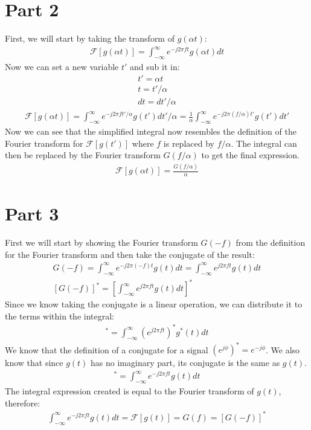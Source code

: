 \documentclass[12 pt]{article}
\begin{document}
\section*{Part 2}
First, we will start by taking the transform of $g(\alpha t)$:
\begin{align*}
    \mathcal{F}[g(\alpha t)]=\int_{-\infty}^{\infty}e^{-j2\pi ft}g(\alpha t)dt
\end{align*}
Now we can set a new variable $t'$ and sub it in:
\begin{align*}
    t'=\alpha t \\
    t = t'/\alpha \\
    dt = dt'/\alpha
\end{align*}
\begin{align*}
    \mathcal{F}[g(\alpha t)]=\int_{-\infty}^{\infty}e^{-j2\pi ft'/\alpha}g(t')dt'/\alpha=
    \frac{1}{\alpha}\int_{-\infty}^{\infty}e^{-j2\pi (f/\alpha)t'}g(t')dt'
\end{align*}
Now we can see that the simplified integral now resembles the definition of the Fourier transform for
$\mathcal{F}[g(t')]$ where $f$ is replaced by $f/\alpha$. The integral can then be replaced by the Fourier transform
$G(f/\alpha)$ to get the final expression.
\begin{align*}
    \mathcal{F}[g(\alpha t)]=\frac{G(f/\alpha)}{\alpha}
\end{align*}

\section*{Part 3}
First we will start by showing the Fourier transform $G(-f)$ from the definition for the Fourier transform and then take
the conjugate of the result:
\begin{align*}
    G(-f) = \int_{-\infty}^{\infty}e^{-j2\pi (-f)t}g(t) dt = \int_{-\infty}^{\infty}e^{j2\pi ft}g(t) dt \\
    [G(-f)]^* = \left[\int_{-\infty}^{\infty}e^{j2\pi ft}g(t) dt\right]^*
\end{align*}
Since we know taking the conjugate is a linear operation, we can distribute it to the terms within the integral:
\begin{align*}
    [G(-f)]^*=\int_{-\infty}^{\infty}(e^{j2\pi ft})^*g^*(t) dt
\end{align*}
We know that the definition of a conjugate for a signal $(e^{j\phi})^*=e^{-j\phi}$. We also know that since $g(t)$ has
no imaginary part, its conjugate is the same as $g(t)$.
\begin{align*}
    [G(-f)]^*=\int_{-\infty}^{\infty}e^{-j2\pi ft}g(t)dt
\end{align*}
The integral expression created is equal to the Fourier transform of $g(t)$, therefore:
\begin{align*}
    \int_{-\infty}^{\infty}e^{-j2\pi ft}g(t)dt=\mathcal{F}[g(t)]=G(f)=[G(-f)]^*
\end{align*}
\end{document}
